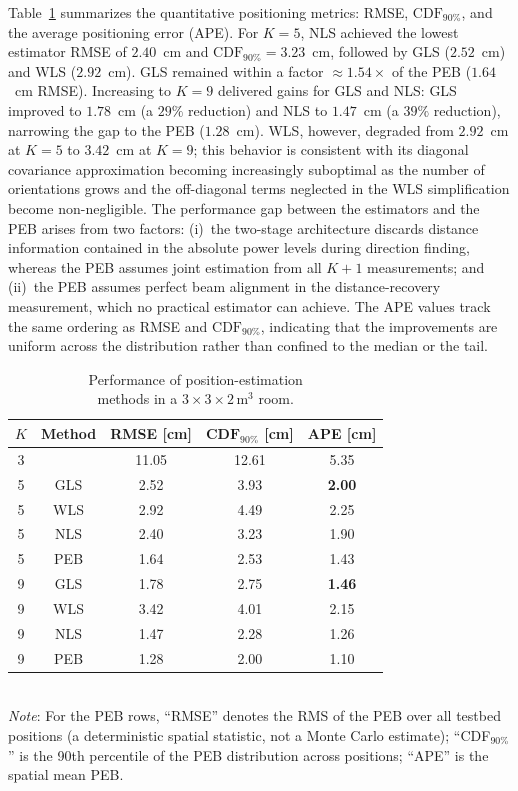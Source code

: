 \documentclass[journal]{IEEEtran}
\begin{document}
Table~\ref{tab:estimation_performance} summarizes the quantitative positioning metrics: RMSE, $\mathrm{CDF}_{90\%}$, and the average positioning error (APE). For $K=5$, NLS achieved the lowest estimator RMSE of $2.40$~cm and $\mathrm{CDF}_{90\%}=3.23$~cm, followed by GLS ($2.52$~cm) and WLS ($2.92$~cm). GLS remained within a factor $\approx1.54\times$ of the PEB ($1.64$~cm RMSE). Increasing to $K=9$ delivered gains for GLS and NLS: GLS improved to $1.78$~cm (a $29\%$ reduction) and NLS to $1.47$~cm (a $39\%$ reduction), narrowing the gap to the PEB ($1.28$~cm). WLS, however, degraded from $2.92$~cm at $K=5$ to $3.42$~cm at $K=9$; this behavior is consistent with its diagonal covariance approximation becoming increasingly suboptimal as the number of orientations grows and the off-diagonal terms neglected in the WLS simplification become non-negligible.
The performance gap between the estimators and the PEB arises from two factors: (i)~the two-stage architecture discards distance information contained in the absolute power levels during direction finding, whereas the PEB assumes joint estimation from all $K+1$ measurements; and (ii)~the PEB assumes perfect beam alignment in the distance-recovery measurement, which no practical estimator can achieve.
The APE values track the same ordering as RMSE and \(\mathrm{CDF}_{90\%}\), indicating that the improvements are uniform across the distribution rather than confined to the median or the tail.

\begin{table}[t]
\centering
\caption{Performance of position-estimation\\ methods in a \(3\times3\times2\,\mathrm{m^3}\) room.}
\label{tab:estimation_performance}
\begin{tabular}{|c| c |c |c| c|}
\hline
\textbf{$K$} & \textbf{Method} & \textbf{RMSE [cm]} & $\textbf{CDF}_{90\%}$ \textbf{[cm]} & \textbf{APE [cm]} \\ \hline
3 & \cite{Chassagne2025} & 11.05 & 12.61 &  5.35 \\ \hline
5 & GLS   &  2.52 &  3.93 &  \textbf{2.00} \\ \hline
5 & WLS   &  2.92 &  4.49 &  2.25 \\ \hline
5 & NLS   &  2.40 &  3.23 &  1.90 \\ \hline
5 & PEB   &  1.64 &  2.53 &  1.43 \\ \hline
9 & GLS   &  1.78 &  2.75 &  \textbf{1.46} \\ \hline
9 & WLS   &  3.42 &  4.01 &  2.15 \\ \hline
9 & NLS   &  1.47 &  2.28 &  1.26 \\ \hline
9 & PEB   &  1.28 &  2.00 &  1.10 \\ \hline
\end{tabular}
\\
\vspace{4pt}
\footnotesize \textit{Note}: For the PEB rows, ``RMSE'' denotes the RMS of the PEB over all testbed positions (a deterministic spatial statistic, not a Monte Carlo estimate); ``CDF$_{90\%}$'' is the 90th percentile of the PEB distribution across positions; ``APE'' is the spatial mean PEB.
\end{table}
\end{document}
